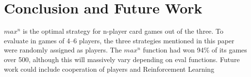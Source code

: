\documentclass[a4paper, twoside, 12pt]{report}
\begin{document}
\chapter{Conclusion and Future Work}

\(max^n\) is the optimal strategy for n-player card games out of the three. To evaluate in games of 4--6 players, the three strategies mentioned in this paper were randomly assigned as players. The \(max^n\) function had won 94\% of its games over 500, although this will massively vary depending on eval functions. Future work could include cooperation of players and Reinforcement Learning




\end{document}
